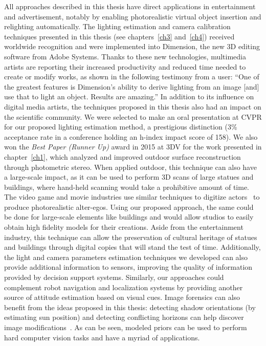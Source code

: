 All approaches described in this thesis have direct applications in entertainment and advertisement, notably by enabling photorealistic virtual object insertion and relighting automatically. The lighting estimation and camera calibration techniques presented in this thesis (see chapters~\ref{ch3} and~\ref{ch4}) received worldwide recognition and were implemented into Dimension, the new 3D editing software from Adobe Systems. Thanks to these new technologies, multimedia artists are reporting their increased productivity and reduced time needed to create or modify works, as shown in the following testimony from a user: ``One of the greatest features is Dimension's ability to derive lighting from an image [and] use that to light an object. Results are amazing.'' In addition to its influence on digital media artists, the techniques proposed in this thesis also had an impact on the scientific community. We were selected to make an oral presentation at CVPR for our proposed lighting estimation method, a prestigious distinction (3\% acceptance rate in a conference holding an h-index impact score of 158). We also won the \emph{Best Paper (Runner Up)} award in 2015 at 3DV for the work presented in chapter~\ref{ch1}, which analyzed and improved outdoor surface reconstruction through photometric stereo. When applied outdoor, this technique can also have a large-scale impact, as it can be used to perform 3D scans of large statues and buildings, where hand-held scanning would take a prohibitive amount of time. The video game and movie industries use similar techniques to digitize actors~\cite{debevec2000acquiring} to produce photorealistic alter-egos. Using our proposed approach, the same could be done for large-scale elements like buildings and would allow studios to easily obtain high fidelity models for their creations. Aside from the entertainment industry, this technique can allow the preservation of cultural heritage of statues and buildings through digital copies that will stand the test of time. Additionally, the light and camera parameters estimation techniques we developed can also provide additional information to sensors, improving the quality of information provided by decision support systems. Similarly, our approaches could complement robot navigation and localization systems by providing another source of attitude estimation based on visual cues. Image forensics can also benefit from the ideas proposed in this thesis: detecting shadow orientations (by estimating sun position) and detecting conflicting horizons can help discover image modifications~\cite{Farid2010}. As can be seen, modeled priors can be used to perform hard computer vision tasks and have a myriad of applications.

